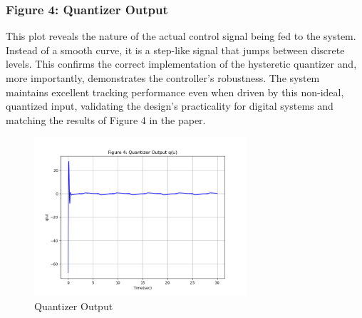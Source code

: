 \clearpage
\subsubsection{Figure 4: Quantizer Output}
 This plot reveals the nature of the actual control signal being fed to the system. Instead of a smooth curve, it is a step-like signal that jumps between discrete levels. This confirms the correct implementation of the hysteretic quantizer and, more importantly, demonstrates the controller's robustness. The system maintains excellent tracking performance even when driven by this non-ideal, quantized input, validating the design's practicality for digital systems and matching the results of Figure 4 in the paper.
\begin{figure}
	\centering
	\includegraphics[width=0.7\textwidth]{images/sim4.png}
	\caption{Quantizer Output}
	\label{fig:fig44}
\end{figure}



 
